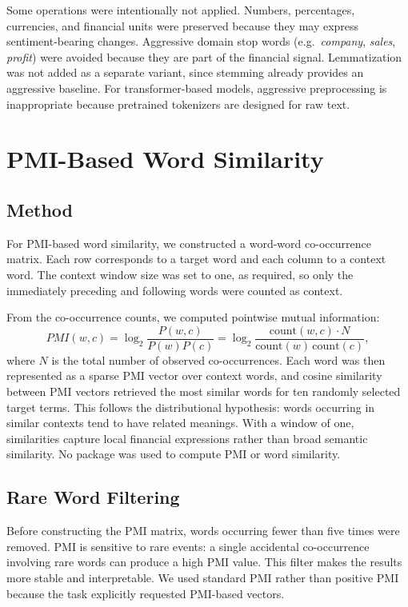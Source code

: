 \documentclass[sigconf,nonacm]{acmart}
\begin{document}
Some operations were intentionally not applied. Numbers, percentages, currencies, and financial units were preserved because they may express sentiment-bearing changes. Aggressive domain stop words (e.g.\ \textit{company}, \textit{sales}, \textit{profit}) were avoided because they are part of the financial signal. Lemmatization was not added as a separate variant, since stemming already provides an aggressive baseline. For transformer-based models, aggressive preprocessing is inappropriate because pretrained tokenizers are designed for raw text.

\section{PMI-Based Word Similarity}
\label{sec:pmi}

\subsection{Method}

For PMI-based word similarity, we constructed a word-word co-occurrence matrix. Each row corresponds to a target word and each column to a context word. The context window size was set to one, as required, so only the immediately preceding and following words were counted as context.

From the co-occurrence counts, we computed pointwise mutual information:
\[
PMI(w,c) = \log_2 \frac{P(w,c)}{P(w)P(c)}
= \log_2 \frac{\mathrm{count}(w,c)\cdot N}{\mathrm{count}(w)\,\mathrm{count}(c)},
\]
where \(N\) is the total number of observed co-occurrences. Each word was then represented as a sparse PMI vector over context words, and cosine similarity between PMI vectors retrieved the most similar words for ten randomly selected target terms. This follows the distributional hypothesis: words occurring in similar contexts tend to have related meanings. With a window of one, similarities capture local financial expressions rather than broad semantic similarity. No package was used to compute PMI or word similarity.

\subsection{Rare Word Filtering}

Before constructing the PMI matrix, words occurring fewer than five times were removed. PMI is sensitive to rare events: a single accidental co-occurrence involving rare words can produce a high PMI value. This filter makes the results more stable and interpretable. We used standard PMI rather than positive PMI because the task explicitly requested PMI-based vectors.
\end{document}
